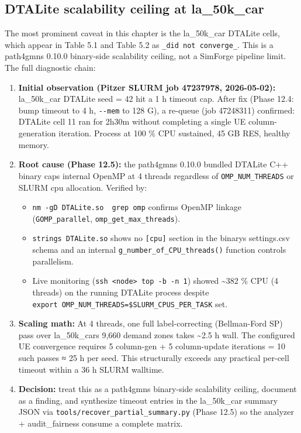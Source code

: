 \subsection{DTALite scalability ceiling at
la\_50k\_car}\label{dtalite-scalability-ceiling-at-la_50k_car}

The most prominent caveat in this chapter is the la\_50k\_car DTALite
cells, which appear in Table 5.1 and Table 5.2 as
\texttt{\_did\ not\ converge\_}. This is a path4gmns 0.10.0 binary-side
scalability ceiling, not a SimForge pipeline limit. The full diagnostic
chain:

\begin{enumerate}
\def\labelenumi{\arabic{enumi}.}
\tightlist
\item
  \textbf{Initial observation (Pitzer SLURM job 47237978, 2026-05-02):}
  la\_50k\_car DTALite seed = 42 hit a 1 h timeout cap. After fix (Phase
  12.4: bump timeout to 4 h, \texttt{-\/-mem} to 128 G), a re-queue (job
  47248311) confirmed: DTALite cell 11 ran for 2h30m without completing
  a single UE column-generation iteration. Process at 100 \% CPU
  sustained, 45 GB RES, healthy memory.
\item
  \textbf{Root cause (Phase 12.5):} the path4gmns 0.10.0 bundled DTALite
  C++ binary caps internal OpenMP at 4 threads regardless of
  \texttt{OMP\_NUM\_THREADS} or SLURM cpu allocation. Verified by:

  \begin{itemize}
  \tightlist
  \item
    \texttt{nm\ -gD\ DTALite.so\ \textbar{}\ grep\ omp} confirms OpenMP
    linkage (\texttt{GOMP\_parallel}, \texttt{omp\_get\_max\_threads}).
  \item
    \texttt{strings\ DTALite.so} shows no \texttt{{[}cpu{]}} section in
    the binary\textquotesingle s settings.csv schema and an internal
    \texttt{g\_number\_of\_CPU\_threads()} function controls
    parallelism.
  \item
    Live monitoring
    (\texttt{ssh\ \textless{}node\textgreater{}\ \textquotesingle{}top\ -b\ -n\ 1\textquotesingle{}})
    showed \textasciitilde382 \% CPU (4 threads) on the running DTALite
    process despite
    \texttt{export\ OMP\_NUM\_THREADS=\$SLURM\_CPUS\_PER\_TASK} set.
  \end{itemize}
\item
  \textbf{Scaling math:} At 4 threads, one full label-correcting
  (Bellman-Ford SP) pass over la\_50k\_car\textquotesingle s 9,660
  demand zones takes \textasciitilde2.5 h wall. The configured UE
  convergence requires 5 column-gen + 5 column-update iterations = 10
  such passes ≈ 25 h per seed. This structurally exceeds any practical
  per-cell timeout within a 36 h SLURM walltime.
\item
  \textbf{Decision:} treat this as a path4gmns binary-side scalability
  ceiling, document as a finding, and synthesize timeout entries in the
  la\_50k\_car summary JSON via
  \texttt{tools/recover\_partial\_summary.py} (Phase 12.5) so the
  analyzer + audit\_fairness consume a complete matrix.
\end{enumerate}

